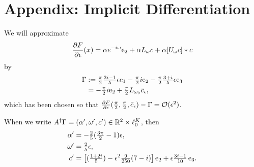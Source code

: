 

\section{Appendix: Implicit Differentiation}
\label{sec:Appendix_Implicit_Diff}

%
%

We will approximate
\[
\frac{\partial F}{\partial  \epsilon}( x ) = \alpha e^{-i \omega} \mathrm{e}_2 + \alpha L_\omega c + \alpha [ U_\omega c] * c 
\]
by
\begin{alignat}{1}
\Gamma & := \tfrac{\pi}{2} \tfrac{3i -1}{5} \epsilon \mathrm{e}_1 - \tfrac{\pi}{2} i \mathrm{e}_2 - \tfrac{\pi}{2} \tfrac{3+i}{5} \epsilon \mathrm{e}_3 \label{e:defGamma}  \\
&=   -\tfrac{\pi}{2} i \mathrm{e}_2 + \tfrac{\pi}{2} L_{\omega_0} \bar{c}_\epsilon , \label{e:defGamma2}
\end{alignat}
which has been chosen so that $\frac{\partial F}{\partial  \epsilon} (\tfrac{\pi}{2},\tfrac{\pi}{2},\bar{c}_\epsilon) - \Gamma = \mathcal{O}(\epsilon^2)$.
\begin{lemma}
	\label{lem:ImplicitApprox}
When we write 
$A^\dagger \Gamma = (\alpha', \omega', c') \in \mathbb{R}^2 \times \ell^K_0$, then 
\begin{alignat*}{1}
		\alpha ' &= - \tfrac{2}{5} ( \tfrac{3 \pi}{2}-1) \epsilon ,\\
		\omega ' &= \tfrac{2}{5} \epsilon , \\
		c '	 &= \left[ (\tfrac{1+2i}{5}) - 
		\epsilon^2 \tfrac{9 }{250} (7-i)
		 \right] \mathrm{e}_2 + \epsilon \tfrac{3i-1}{10} \, \mathrm{e}_3 .
	\end{alignat*}
\end{lemma}

